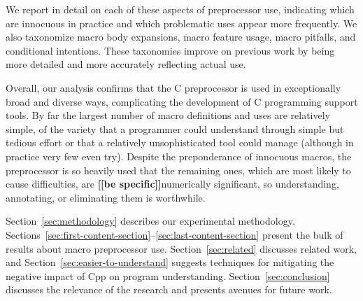 \documentclass[10pt]{article}
\newcommand{\comment}[1]{\textbf{[[#1]]}}
\begin{document}
We report in detail on each of these aspects of preprocessor use,
indicating which are innocuous in practice and which problematic
uses appear more frequently.  We also taxonomize macro body
expansions, macro feature usage, macro pitfalls, and conditional
intentions.  These taxonomies improve on previous work by being more
detailed and more accurately reflecting actual use.

Overall, our analysis confirms that the C preprocessor is used in
exceptionally broad and diverse ways, complicating the development of C
programming support tools.  By far the largest number of macro definitions
and uses are relatively simple, of the variety that a programmer could
understand through simple but tedious effort or that a relatively
unsophisticated tool could manage (although in practice very few even
try).  Despite the preponderance of innocuous macros, the preprocessor is
so heavily used that the remaining ones, which are most likely to cause
difficulties, are \comment{be specific}numerically significant, so understanding, annotating, or
eliminating them is worthwhile.

Section~\ref{sec:methodology} describes our experimental methodology.
Sections~\ref{sec:first-content-section}--\ref{sec:last-content-section}
present the bulk of results about macro preprocessor use.
Section~\ref{sec:related} discusses related work, and
Section~\ref{sec:easier-to-understand} suggests techniques for mitigating
the negative impact of Cpp on program understanding.
Section~\ref{sec:conclusion} discusses the relevance of the research and
presents avenues for future work.

\end{document}
